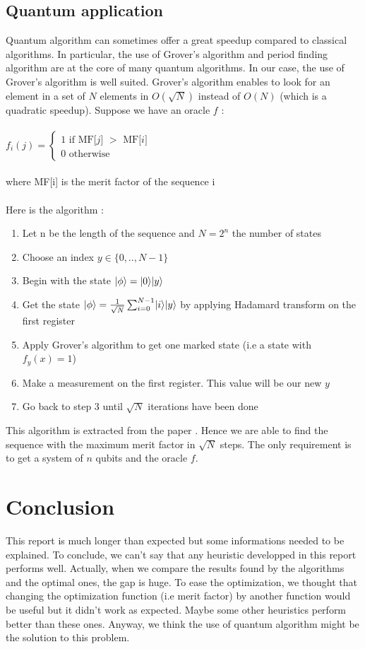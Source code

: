 \documentclass[a4paper,11pt,openany]{article}
\begin{document}
\subsection{Quantum application}
\DeclarePairedDelimiter\bra{\langle}{\rvert}
\DeclarePairedDelimiter\ket{\lvert}{\rangle}
\noindent
Quantum algorithm can sometimes offer a great speedup compared to classical algorithms. In particular, the use of Grover's algorithm \cite{search} and period finding algorithm are at the core of many quantum algorithms. In our case, the use of Grover's algorithm is well suited. Grover's algorithm enables to look for an element in a set of $N$ elements in $O(\sqrt{N})$ instead of $O(N)$ (which is a quadratic speedup).
Suppose we have an oracle $f$ :\\\\
$f_i(j)=\left\{
\begin{array}{l}
  1 \text{ if MF[$j$] $>$ MF[$i$]} \\
  0 \text{ otherwise}
\end{array}
\right.$\\\\
where MF[i] is the merit factor of the sequence i\\\\
Here is the algorithm :
\begin{enumerate}
\item Let n be the length of the sequence and $N=2^n$ the number of states
\item Choose an index $y \in \{0,..,N-1\}$
\item Begin with the state $\ket{\phi}=\ket{0}\ket{y}$
\item Get the state $\ket{\phi}=\frac{1}{\sqrt{N}}\sum_{i=0}^{N-1}\ket{i}\ket{y}$ by applying Hadamard transform on the first register
\item Apply Grover's algorithm to get one marked state (i.e a state with $f_y(x)=1$)
\item Make a measurement on the first register. This value will be our new $y$
\item Go back to step 3 until $\sqrt{N}$ iterations have been done
\end{enumerate}
This algorithm is extracted from the paper \cite{max_quantum}. Hence we are able to find the sequence with the maximum merit factor in $\sqrt{N}$ steps. The only requirement is to get a system of $n$ qubits and the oracle $f$.
\section{Conclusion}
\noindent
This report is much longer than expected but some informations needed to be explained. To conclude, we can't say that any heuristic developped in this report performs well. Actually, when we compare the results found by the algorithms and the optimal ones, the gap is huge. To ease the optimization, we thought that changing the optimization function (i.e merit factor) by another function would be useful but it didn't work as expected. Maybe some other heuristics perform better than these ones. Anyway, we think the use of quantum algorithm might be the solution to this problem.
\end{document}
